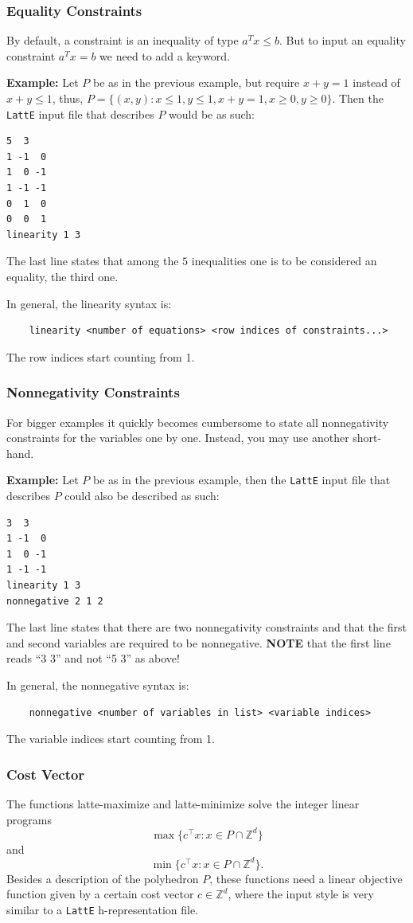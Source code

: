 \documentclass{article}
\newcommand{\Z}{{\mathbb Z}}
\newcommand{\latte}{{\tt LattE}\xspace}
\newcommand{\example}{{\bf Example:\space}}
\begin{document}
\subsubsection{Equality Constraints}

By default, a constraint is an inequality of type $a^Tx\leq b$. But to input an equality constraint $a^Tx=b$ we need to add a keyword.

\example
Let $P$ be as in the previous example, but require $x+y=1$ instead of
$x+y\leq 1$, thus, 
$P=\{(x,y): x\leq 1, y\leq 1, x+y=1, x\geq 0, y\geq 0\}$.
Then the {\tt LattE} input file that describes $P$ would be as such:
\begin{verbatim}
5  3
1 -1  0
1  0 -1
1 -1 -1
0  1  0
0  0  1
linearity 1 3
\end{verbatim}
The last line states that among the $5$ inequalities one is to be
considered an equality, the third one.

In general, the linearity syntax is:
\begin{verbatim}
	linearity <number of equations> <row indices of constraints...>
\end{verbatim}
The row indices start counting from 1.

\subsubsection{Nonnegativity Constraints}
For bigger examples it quickly becomes cumbersome to state all
nonnegativity constraints for the variables one by one. Instead, you
may use another short-hand.

\example
Let $P$ be as in the previous example, then the {\tt LattE} input file
that describes $P$ could also be described as such: 
\begin{verbatim}
3  3
1 -1  0
1  0 -1
1 -1 -1
linearity 1 3
nonnegative 2 1 2
\end{verbatim}
The last line states that there are two nonnegativity constraints and
that the first and second variables are required to be nonnegative. 
{\bf NOTE} that the first line reads ``3 3'' and not ``5 3'' as above! 

In general, the nonnegative syntax is:
\begin{verbatim}
	nonnegative <number of variables in list> <variable indices>
\end{verbatim}
The variable indices  start counting from 1.


\subsubsection{Cost Vector}
The functions latte-maximize and latte-minimize solve the integer linear programs
\[
\max\{c^\intercal x: x\in P\cap\Z^d\}
\]
and
\[
\min\{c^\intercal x: x\in P\cap\Z^d\}.
\]
Besides a description of the polyhedron $P$, these functions need a
linear objective function given by a certain cost vector $c \in \Z^d$, where the input style is very similar to a \latte h-representation file. 
\end{document}
